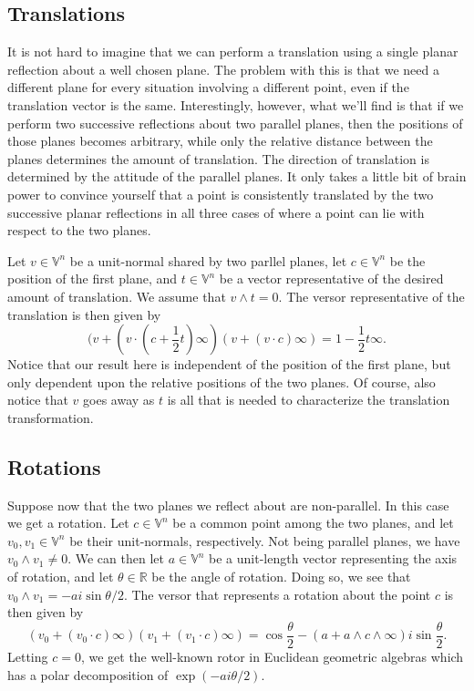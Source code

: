 \documentclass[12pt]{article}
\newcommand{\V}{\mathbb{V}}
\newcommand{\R}{\mathbb{R}}
\newcommand{\nvai}{\infty}
\begin{document}
\subsection{Translations}\label{sec_translation_versors}

It is not hard to imagine that we can perform a translation
using a single planar reflection about a well chosen plane.
The problem with this is that we need a different plane for
every situation involving a different point, even if the translation
vector is the same.  Interestingly, however, what we'll find is that
if we perform two successive reflections about two parallel planes, then
the positions of those planes becomes arbitrary, while only the relative
distance between the planes determines the amount of translation.
The direction of translation is determined by the attitude of the parallel planes.
It only takes a little bit of brain power to convince yourself that a point is consistently
translated by the two successive planar reflections in all three cases of where
a point can lie with respect to the two planes.

Let $v\in\V^n$ be a unit-normal shared by two parllel planes, let
$c\in\V^n$ be the position of the first plane, and $t\in\V^n$
be a vector representative of the desired amount of translation.
We assume that $v\wedge t=0$.
The versor representative of the translation is then given by
\begin{equation*}
(v+(v\cdot(c+\frac{1}{2}t)\nvai)(v+(v\cdot c)\nvai) = 1 - \frac{1}{2}t\nvai.
\end{equation*}
Notice that our result here is independent of the position of the
first plane, but only dependent upon the relative positions of
the two planes.
Of course, also notice that $v$ goes away as $t$ is all that
is needed to characterize the translation transformation.


\subsection{Rotations}

Suppose now that the two planes we reflect about are
non-parallel.  In this case we get a rotation.  Let $c\in\V^n$
be a common point among the two planes, and let $v_0,v_1\in\V^n$
be their unit-normals, respectively.  Not being parallel planes,
we have $v_0\wedge v_1\neq 0$.  We can then let $a\in\V^n$
be a unit-length vector representing the axis of rotation, and
let $\theta\in\R$ be the angle of rotation.  Doing so, we see
that $v_0\wedge v_1=-ai\sin\theta/2$.  The versor that
represents a rotation about the point $c$ is then given by
\begin{equation*}
(v_0+(v_0\cdot c)\nvai)(v_1+(v_1\cdot c)\nvai) = \cos\frac{\theta}{2} - (a+a\wedge c\wedge\nvai)i\sin\frac{\theta}{2}.
\end{equation*}
Letting $c=0$, we get the well-known rotor in Euclidean geometric algebras which
has a polar decomposition of $\exp(-ai\theta/2)$.
\end{document}
